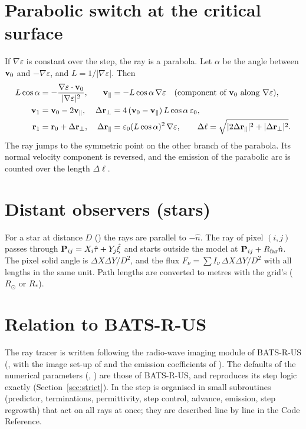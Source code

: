 \section{Parabolic switch at the critical surface}\label{sec:parab}
If $\nabla\varepsilon$ is constant over the step, the ray is a parabola. Let $\alpha$ be
the angle between $\mathbf{v}_0$ and $-\nabla\varepsilon$, and $L=1/|\nabla\varepsilon|$.
Then
\begin{align*}
  L\cos\alpha &= -\frac{\nabla\varepsilon\cdot\mathbf{v}_0}{|\nabla\varepsilon|^2}, &
  \mathbf{v}_\parallel &= -L\cos\alpha\,\nabla\varepsilon\quad(\text{component of }\mathbf{v}_0\text{ along }\nabla\varepsilon),\\
  \mathbf{v}_1 &= \mathbf{v}_0-2\mathbf{v}_\parallel, &
  \Delta\mathbf{r}_\perp &= 4\,(\mathbf{v}_0-\mathbf{v}_\parallel)\,L\cos\alpha\,\varepsilon_0,\\
  \mathbf{r}_1 &= \mathbf{r}_0+\Delta\mathbf{r}_\perp, &
  \Delta\mathbf{r}_\parallel &= \varepsilon_0(L\cos\alpha)^2\,\nabla\varepsilon,\qquad
  \Delta\ell=\sqrt{|2\Delta\mathbf{r}_\parallel|^2+|\Delta\mathbf{r}_\perp|^2}.
\end{align*}
The ray jumps to the symmetric point on the other branch of the parabola. Its normal
velocity component is reversed, and the emission of the parabolic arc is counted over the
length $\Delta\ell$.

\section{Distant observers (stars)}
For a star at distance $D$ () the rays are parallel to $-\hat n$. The
ray of pixel $(i,j)$ passes through $\mathbf{P}_{ij}=X_i\hat\tau+Y_j\hat\xi$ and starts
outside the model at $\mathbf{P}_{ij}+R_\text{far}\hat n$. The pixel solid angle is
$\Delta X\Delta Y/D^2$, and the flux $F_\nu=\sum I_\nu\,\Delta X\Delta Y/D^2$ with all lengths in
the same unit. Path lengths are converted to metres with the grid's 
($R_\odot$ or $R_\ast$).

\section{Relation to BATS-R-US}
The ray tracer is written following the radio-wave imaging module of BATS-R-US
(, with the image set-up of 
and the emission coefficients of ). The defaults of the
numerical parameters (, ) are those of BATS-R-US, and
 reproduces its step logic exactly
(Section~\ref{sec:strict}). In  the step is organised in small
subroutines (predictor, terminations, permittivity, step control, advance, emission,
step regrowth) that act on all rays at once; they are described line by line in the
Code Reference.

